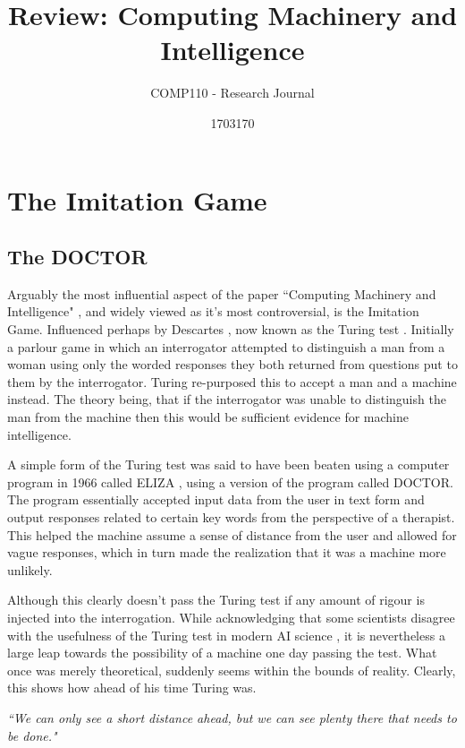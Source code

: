 \documentclass{scrartcl}
\title{Review: Computing Machinery and Intelligence
}
\subtitle{COMP110 - Research Journal}
\author{1703170}
\begin{document}
\maketitle

\section{The Imitation Game}

\subsection{The DOCTOR}

Arguably the most influential aspect of the paper \textquotedblleft Computing Machinery and Intelligence" \cite{turing1950computing:1}, and widely viewed as it's most controversial, is the Imitation Game. Influenced perhaps by Descartes \cite{descartes1996discourse:2}, now known as the Turing test \cite{suchman1987plans:3}. Initially a parlour game in which an interrogator attempted to distinguish a man from a woman using only the worded responses they both returned from questions put to them by the interrogator. Turing re-purposed this to accept a man and a machine instead. The theory being, that if the interrogator was unable to distinguish the man from the machine then this would be sufficient evidence for machine intelligence.

A simple form of the Turing test was said to have been beaten using a computer program in 1966 called ELIZA \cite{weizenbaum1966eliza:4}, using a version of the program called DOCTOR. The program essentially accepted input data from the user in text form and output responses related to certain key words from the perspective of a therapist. This helped the machine assume a sense of distance from the user and allowed for vague responses, which in turn made the realization that it was a machine more unlikely.

Although this clearly doesn't pass the Turing test if any amount of rigour is injected into the interrogation. While acknowledging that some scientists disagree with the usefulness of the Turing test in modern AI science \cite{hayes1995turing:5}, it is nevertheless a large leap towards the possibility of a machine one day passing the test. What once was merely theoretical, suddenly seems within the bounds of reality. Clearly, this shows how ahead of his time Turing was.

\textit{\textquotedblleft We can only see a short distance ahead, but we can see plenty there that needs to be done."} 
\end{document}
